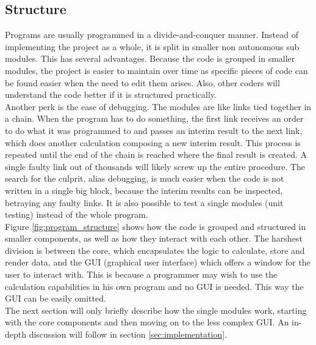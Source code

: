 \documentclass[12pt,a4paper,titlepage]{article}
\begin{document}
	\subsection{Structure}
	Programs are usually programmed in a divide-and-conquer manner. Instead of implementing the project as a whole, it is split in smaller non autonomous sub modules. This has several advantages. Because the code is grouped in smaller modules, the project is easier to maintain over time as specific pieces of code can be found easier when the need to edit them arises. Also, other coders will understand the code better if it is structured practically.\\
	Another perk is the ease of debugging. The modules are like links tied together in a chain. When the program has to do something, the first link receives an order to do what it was programmed to and passes an interim result to the next link, which does another calculation composing a new interim result. This process is repeated until the end of the chain is reached where the final result is created. A single faulty link out of thousands will likely screw up the entire procedure. The search for the culprit, alias debugging, is much easier when the code is not written in a single big block, because the interim results can be inspected, betraying any faulty links. It is also possible to test a single modules (unit testing) instead of the whole program.\\
	Figure \ref{fig:program_structure} shows how the code is grouped and structured in smaller components, as well as how they interact with each other. The harshest division is between the core, which encapsulates the logic to calculate, store and render data, and the GUI (graphical user interface) which offers a window for the user to interact with. This is because a programmer may wish to use the calculation capabilities in his own program and no GUI is needed. This way the GUI can be easily omitted.\\
	The next section will only briefly describe how the single modules work, starting with the core components and then moving on to the less complex GUI. An in-depth discussion will follow in section \ref{sec:implementation}.
\end{document}
